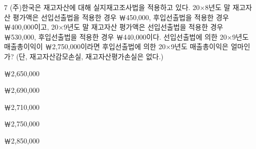 \begin{question}{7}
(주)한국은 재고자산에 대해 실지재고조사법을 적용하고 있다. 20×8년도 말 재고자산 평가액은 선입선출법을 적용한 경우 ￦450,000, 후입선출법을 적용한 경우 ￦400,000이고, 20×9년도 말 재고자산 평가액은 선입선출법을 적용한 경우 ￦530,000, 후입선출법을 적용한 경우 ￦440,000이다. 선입선출법에 의한 20×9년도 매출총이익이 ￦2,750,000이라면 후입선출법에 의한 20×9년도 매출총이익은 얼마인가? (단, 재고자산감모손실, 재고자산평가손실은 없다.)
\begin{choices}
  \item ￦2,650,000
  \item ￦2,690,000
  \item ￦2,710,000
  \item ￦2,750,000
  \item ￦2,850,000
\end{choices}
\end{question}
